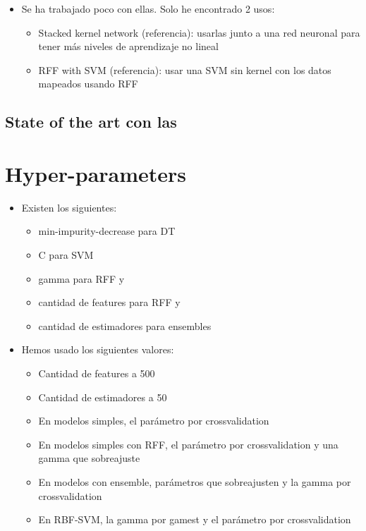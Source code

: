 \begin{note}
  \begin{itemize}
    \item Se ha trabajado poco con ellas. Solo he encontrado 2 usos:
    \begin{itemize}
      \item Stacked kernel network (referencia): usarlas junto a una red
      neuronal para tener más niveles de aprendizaje no lineal
      \item RFF with SVM (referencia): usar una SVM sin kernel con los datos
      mapeados usando RFF
    \end{itemize}
  \end{itemize}
\end{note}
\begin{note}
  \subsection{State of the art con las \Nys}
\end{note}


\section{Hyper-parameters}
\begin{note}
  \begin{itemize}
    \item Existen los siguientes:
    \begin{itemize}
      \item min-impurity-decrease para DT
      \item C para SVM
      \item gamma para RFF y \Nys
      \item cantidad de features para RFF y \Nys
      \item cantidad de estimadores para ensembles
    \end{itemize}
    \item Hemos usado los siguientes valores:
    \begin{itemize}
      \item Cantidad de features a 500
      \item Cantidad de estimadores a 50
      \item En modelos simples, el parámetro por crossvalidation
      \item En modelos simples con RFF, el parámetro por crossvalidation
      y una gamma que sobreajuste
      \item En modelos con ensemble, parámetros que sobreajusten y la gamma
      por crossvalidation
      \item En RBF-SVM, la gamma por gamest y el parámetro por crossvalidation
    \end{itemize}
  \end{itemize}
\end{note}

